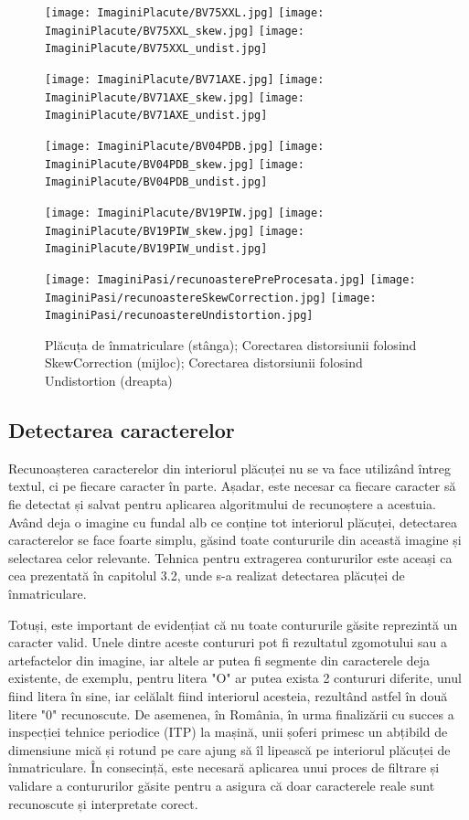 \documentclass[12pt]{article}
\begin{document}
\begin{figure}[H]
  \centering
  \texttt{[image: ImaginiPlacute/BV75XXL.jpg]}\hfill
    \texttt{[image: ImaginiPlacute/BV75XXL\_skew.jpg]}\hfill
    \texttt{[image: ImaginiPlacute/BV75XXL\_undist.jpg]}
    
     \texttt{[image: ImaginiPlacute/BV71AXE.jpg]}\hfill
    \texttt{[image: ImaginiPlacute/BV71AXE\_skew.jpg]}\hfill
    \texttt{[image: ImaginiPlacute/BV71AXE\_undist.jpg]}
    
     \texttt{[image: ImaginiPlacute/BV04PDB.jpg]}\hfill
    \texttt{[image: ImaginiPlacute/BV04PDB\_skew.jpg]}\hfill
    \texttt{[image: ImaginiPlacute/BV04PDB\_undist.jpg]}

     \texttt{[image: ImaginiPlacute/BV19PIW.jpg]}\hfill
    \texttt{[image: ImaginiPlacute/BV19PIW\_skew.jpg]}\hfill
    \texttt{[image: ImaginiPlacute/BV19PIW\_undist.jpg]}

      \texttt{[image: ImaginiPasi/recunoasterePreProcesata.jpg]}\hfill
    \texttt{[image: ImaginiPasi/recunoastereSkewCorrection.jpg]}\hfill
    \texttt{[image: ImaginiPasi/recunoastereUndistortion.jpg]}
  \caption{Pl\u{a}cuța de \^{i}nmatriculare (st\^{a}nga); Corectarea distorsiunii folosind SkewCorrection (mijloc); Corectarea distorsiunii folosind Undistortion (dreapta)}
  \label{fig:recunoastere_rezultate}
\end{figure}

\newpage

\subsection{Detectarea caracterelor}

Recunoașterea caracterelor din interiorul pl\u{a}cuței nu se va face utiliz\^{a}nd \^{i}ntreg textul, ci pe fiecare caracter \^{i}n parte. Așadar, este necesar ca fiecare caracter s\u{a} fie detectat și salvat pentru aplicarea algoritmului de recunoștere a acestuia. Av\^{a}nd deja o imagine cu fundal alb ce conține tot interiorul pl\u{a}cuței, detectarea caracterelor se face foarte simplu, g\u{a}sind toate contururile din aceast\u{a} imagine și selectarea celor relevante. Tehnica pentru extragerea contururilor este aceași ca cea prezentat\u{a} \^{i}n capitolul 3.2, unde s-a realizat detectarea pl\u{a}cuței de \^{i}nmatriculare.

Totuși, este important de evidențiat c\u{a} nu toate contururile g\u{a}site reprezint\u{a} un caracter valid. Unele dintre aceste contururi pot fi rezultatul zgomotului sau a artefactelor din imagine, iar altele ar putea fi segmente din caracterele deja existente, de exemplu, pentru litera "O" ar putea exista 2 contururi diferite, unul fiind litera \^{i}n sine, iar cel\u{a}lalt fiind interiorul acesteia, rezult\^{a}nd astfel \^{i}n dou\u{a} litere "0" recunoscute. De asemenea, \^{i}n Rom\^{a}nia, \^{i}n urma finaliz\u{a}rii cu succes a inspecției tehnice periodice (ITP) la mașin\u{a}, unii șoferi primesc un abțibild de dimensiune mic\u{a} și rotund pe care ajung s\u{a} \^{i}l lipeasc\u{a} pe interiorul pl\u{a}cuței de \^{i}nmatriculare. \^{I}n consecinț\u{a}, este necesar\u{a} aplicarea unui proces de filtrare și validare a contururilor g\u{a}site pentru a asigura c\u{a} doar caracterele reale sunt recunoscute și interpretate corect.
\end{document}
